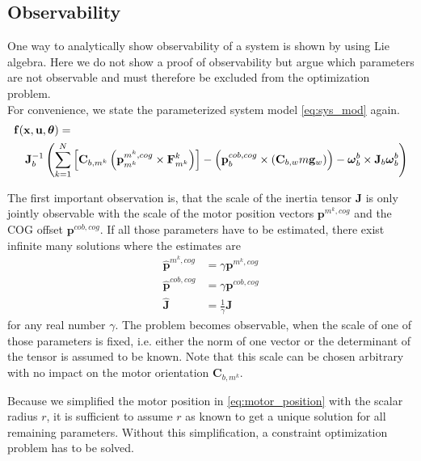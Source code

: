 \subsection{Observability}
\label{sub:observability}
One way to analytically show observability of a system is shown by \citet{hermann1977} using Lie algebra. 
Here we do not show a proof of observability but argue which parameters are not observable and must therefore be excluded from the optimization problem.
\\
For convenience, we state the parameterized system model \cref{eq:sys_mod} again.
\begin{align*}
\lefteqn{ \mathbf{f}(\mathbf{x}, \mathbf{u}, \boldsymbol{\theta}) = {} }\\
& & {} \mathbf{J}_b^{-1} \left( 
\sum_{k=1}^N  \left[  \mathbf{C}_{b,m^k} \left( \mathbf{p}^{m^k,cog}_{m^k} \times \mathbf{F}^k_{m^k} \right)  \right]
-
\left( \mathbf{p}^{cob,cog}_b \times (\mathbf{C}_{b,w}m\mathbf{g}_w) \right)
- \boldsymbol{\omega}_b^b \times \mathbf{J}_b \boldsymbol{\omega}_b^b \right) \nonumber
\end{align*}

The first important observation is, that the scale of the inertia tensor $\mathbf{J}$ is only jointly observable with the scale of the motor position vectors $\mathbf{p}^{m^k,cog}$ and the COG offset $\mathbf{p}^{cob,cog}$.
If all those parameters have to be estimated, there exist infinite many solutions where the estimates are
\begin{equation}
\begin{aligned}
 \hat{\mathbf{p}}^{m^k,cog} &= \gamma \mathbf{p}^{m^k,cog} \\
 \hat{\mathbf{p}}^{cob,cog} &= \gamma \mathbf{p}^{cob,cog} \\
 \hat{\mathbf{J}}           &= \frac{1}{\gamma} \mathbf{J}
\end{aligned}
\end{equation}
for any real number $\gamma$.
The problem becomes observable, when the scale of one of those parameters is fixed, i.e. either the norm of one vector or the determinant of the tensor is assumed to be known.
Note that this scale can be chosen arbitrary with no impact on the motor orientation $\mathbf{C}_{b,m^k}$.

Because we simplified the motor position in \cref{eq:motor_position} with the scalar radius $r$, it is sufficient to assume $r$ as known to get a unique solution for all remaining parameters.
Without this simplification, a constraint optimization problem has to be solved.
\\

